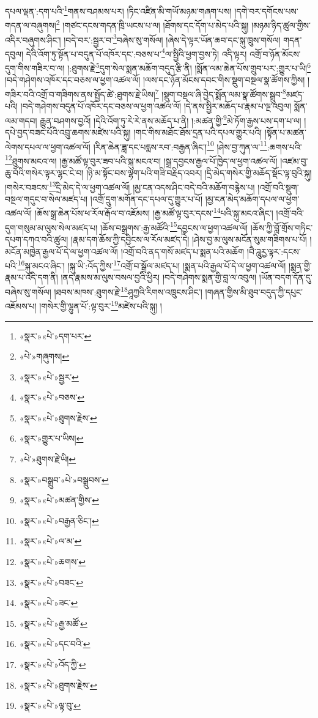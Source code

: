 དཔལ་ལྡན་:དག་པའི་\footnote{«སྣར་»«པེ་»དག་པར་}གནས་བཤམས་པར། །ཏིང་འཛིན་མི་གཡོ་མཉམ་གཞག་པས། །དགེ་བར་དགོངས་པས་གདན་ལ་བཞུགས།\footnote{«པེ་»གཞུགས།} །གཙང་དངས་གདན་ཁྲི་ཡངས་པ་ལ། །ཐོགས་དང་དོག་པ་མེད་པའི་སྐུ། །མཉམ་ཉིད་ཚུལ་གྱིས་འདིར་བཞུགས་ཤིང་། །བདེ་བར་:སྦྱར་བ་\footnote{«སྣར་»«པེ་»སྦྱར་}བཞེས་སུ་གསོལ། །ཞེས་དེ་ལྟར་ཡོན་ཆབ་དང་སྐུ་ཁྲུས་གསོལ། གདན་དབུལ། དེའི་འོག་ཏུ་སྟོན་པ་བདུན་པོ་འཁོར་དང་:བཅས་པ་\footnote{«སྣར་»«པེ་»བཅས་}ལ་སྤྱིའི་ཕྱག་བྱས་ཏེ། འདི་ལྟར། འགྲོ་བ་ཉོན་མོངས་དུག་གིས་གཟིར་བ་ལ། །:ཐུགས་རྗེ་\footnote{«སྣར་»«པེ་»ཐུགས་རྗེས་}དུག་སེལ་སྨན་མཆོག་བདུད་རྩི་ནི། །སྨོན་ལམ་ཆེན་པོས་གྲུབ་པར་:གྱུར་པ་ཡི།\footnote{«སྣར་»གྱུར་པ་ཡིས།} །བདེ་གཤེགས་འཁོར་དང་བཅས་ལ་ཕྱག་འཚལ་ལོ། །ལས་དང་ཉོན་མོངས་དབང་གིས་སྡུག་བསྔལ་སྣ་ཚོགས་ཀྱིས། །གཟིར་བའི་འགྲོ་བ་གཟིགས་ནས་སྤྱོད་ཚེ་:ཐུགས་རྗེ་ཡིས།\footnote{«པེ་»ཐུགས་རྗེ་ཡི།} །སྡུག་བསྔལ་ཞི་བྱེད་སྨོན་ལམ་སྣ་ཚོགས་སྒྲུབ་\footnote{«སྣར་»བསྒྲུབ་«པེ་»བསྒྲུབས་}མཛད་པའི། །བདེ་གཤེགས་བདུན་པོ་འཁོར་དང་བཅས་ལ་ཕྱག་འཚལ་ལོ། །དེ་ནས་སྤྱིར་མཆོད་པ་རྣམ་པ་ལྔ་འབུལ། སྨོན་ལམ་གདབ། རྒྱུན་བཤགས་བྱའོ། །དེའི་འོག་ཏུ་རེ་རེ་ནས་མཆོད་པ་ནི། །:མཚན་གྱི་\footnote{«སྣར་»«པེ་»མཚན་གྱིས་}མེ་ཏོག་རྒྱས་པས་དག་པ་ལ། །དཔེ་བྱད་བཟང་པོའི་འབྲུ་ཆགས་མཛེས་པའི་སྐུ། །གང་གིས་མཐོང་ཐོས་དྲན་པའི་དཔལ་གྱུར་པའི། །སྟོན་པ་མཚན་ལེགས་དཔལ་ལ་ཕྱག་འཚལ་ལོ། །རིན་ཆེན་ཟླ་དང་པདྨས་རབ་:བརྒྱན་ཞིང་།\footnote{«སྣར་»«པེ་»བརྒྱན་ཅིང་།} །ཤེས་བྱ་ཀུན་ལ་\footnote{«སྣར་»«པེ་»ལ་མ་}:ཆགས་པའི་\footnote{«སྣར་»«པེ་»ཆགས་}ཐུགས་མངའ་ལ། །རྒྱ་མཚོ་ལྟ་བུར་ཟབ་པའི་སྐུ་མངའ་བ། །སྒྲ་དབྱངས་རྒྱལ་པོ་ཁྱེད་ལ་ཕྱག་འཚལ་ལོ། །འཛམ་བུ་ཆུ་བོའི་གསེར་ལྟར་ལྷང་ངེ་བ། །ཉི་མ་སྟོང་བས་ལྷག་པའི་གཟི་བརྗིད་འབར། །དྲི་མེད་གསེར་གྱི་མཆོད་སྡོང་ལྟ་བུའི་སྐུ། །གསེར་བཟངས་\footnote{«སྣར་»«པེ་»བཟང་}དྲི་མེད་དེ་ལ་ཕྱག་འཚལ་ལོ། །མྱ་ངན་འདས་ཤིང་བདེ་བའི་མཆོག་བརྙེས་པ། །འགྲོ་བའི་སྡུག་བསྔལ་གདུང་བ་སེལ་མཛད་པ། །འགྲོ་དྲུག་མགོན་དང་དཔལ་དུ་གྱུར་པ་པོ། །མྱ་ངན་མེད་མཆོག་དཔལ་ལ་ཕྱག་འཚལ་ལོ། །ཆོས་སྒྲ་ཆེན་པོས་ཕ་རོལ་རྒོལ་བ་འཇོམས། །རྒྱ་མཚོ་ལྟ་བུར་དངས་\footnote{«སྣར་»«པེ་»ཟང་}པའི་སྐུ་མངའ་ཞིང་། །འགྲོ་བའི་དུག་གསུམ་མ་ལུས་སེལ་མཛད་པ། །ཆོས་བསྒྲགས་:རྒྱ་མཚོའི་\footnote{«སྣར་»«པེ་»རྒྱ་མཚོ་}དབྱངས་ལ་ཕྱག་འཚལ་ལོ། །ཆོས་ཀྱི་བློ་གྲོས་གཏིང་དཔག་དཀའ་བའི་ཚུལ། །རྣམ་དག་ཆོས་ཀྱི་དབྱིངས་ལ་རོལ་མཛད་དེ། །ཤེས་བྱ་མ་ལུས་མངོན་སུམ་གཟིགས་པ་པོ། །མངོན་མཁྱེན་རྒྱལ་པོ་དེ་ལ་ཕྱག་འཚལ་ལོ། །འགྲོ་བའི་ནད་གསོ་མཛད་པ་སྨན་པའི་མཆོག །བཻ་ཌཱུརྱ་ལྟར་:དངས་པའི་\footnote{«སྣར་»«པེ་»དང་བའི་}སྐུ་མངའ་ཞིང་། །སྐུ་ཡི་:འོད་ཀྱིས་\footnote{«སྣར་»«པེ་»འོད་ཀྱི་}འགྲོ་བ་སྒྲོལ་མཛད་པ། །སྨན་པའི་རྒྱལ་པོ་དེ་ལ་ཕྱག་འཚལ་ལོ། །སྨན་གྱི་རྣམ་པ་འདི་དག་ནི། །ནད་རྣམས་མ་ལུས་བསལ་བྱའི་ཕྱིར། །བདེ་གཤེགས་སྨན་གྱི་བླ་ལ་འབུལ། །ཡོན་བདག་དོན་དུ་བཞེས་སུ་གསོལ། །ཐབས་མཁས་:ཐུགས་རྗེ་\footnote{«སྣར་»«པེ་»ཐུགས་རྗེས་}ཤཱཀྱའི་རིགས་འཁྲུངས་ཤིང་། །གཞན་གྱིས་མི་ཐུབ་བདུད་ཀྱི་དཔུང་འཇོམས་པ། །གསེར་གྱི་ལྷུན་པོ་:ལྟ་བུར་\footnote{«སྣར་»«པེ་»ལྟ་བུ་}མཛེས་པའི་སྐུ། །
